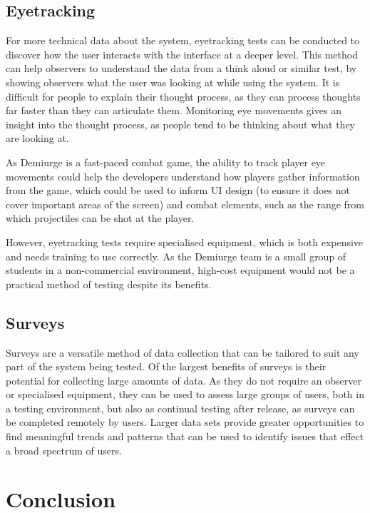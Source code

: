 \documentclass{scrartcl}
\begin{document}
\subsection{Eyetracking}
For more technical data about the system, eyetracking tests can be conducted to discover how the user interacts with the interface at a deeper level. This method can help observers to understand the data from a think aloud or similar test, by showing observers what the user was looking at while using the system. It is difficult for people to explain their thought process, as they can process thoughts far faster than they can articulate them. Monitoring eye movements gives an insight into the thought process, as people tend to be thinking about what they are looking at. \cite{eyeTracking}

As Demiurge is a fast-paced combat game, the ability to track player eye movements could help the developers understand how players gather information from the game, which could be used to inform UI design (to ensure it does not cover important areas of the screen) and combat elements, such as the range from which projectiles can be shot at the player.

However, eyetracking tests require specialised equipment, which is both expensive and needs training to use correctly. As the Demiurge team is a small group of students in a non-commercial environment, high-cost equipment would not be a practical method of testing despite its benefits.


\subsection{Surveys}
Surveys are a versatile method of data collection that can be tailored to suit any part of the system being tested. Of the largest benefits of surveys is their potential for collecting large amounts of data. As they do not require an observer or specialised equipment, they can be used to assess large groups of users, both in a testing environment, but also as continual testing after release, as surveys can be completed remotely by users. Larger data sets provide greater opportunities to find meaningful trends and patterns that can be used to identify issues that effect a broad spectrum of users.


\section{Conclusion}





\end{document}
